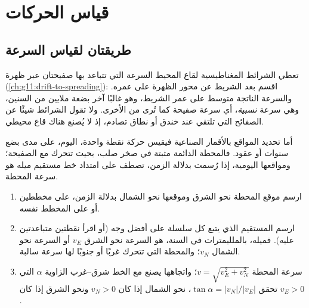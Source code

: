 \section{قياس الحركات}

\subsection{طريقتان لقياس السرعة}

تعطي الشرائط المغناطيسية لقاع المحيط السرعة التي تتباعد بها صفيحتان
عبر ظهرة (\cref{ch:g11:drift-to-spreading}): اقسم
بعد الشريط عن محور الظهرة على عمره. والسرعة الناتجة
متوسط على عمر الشريط، وهو غالبًا آخر بضعة ملايين من السنين، وهي
سرعة \emph{نسبية}، أي سرعة صفيحة كما تُرى من الأخرى. ولا تقول الشرائط
شيئًا عن الصفائح التي تلتقي عند خندق أو نطاق تصادم، إذ لا يُصنع
هناك قاع محيطي.

أما تحديد المواقع بالأقمار الصناعية فيقيس حركة نقطة واحدة، اليوم، على مدى
بضع سنوات أو عقود. فالمحطة الدائمة مثبتة في صخر صلب، بحيث
تتحرك مع الصفيحة؛ ومواقعها اليومية، إذا رُسمت بدلالة الزمن، تصطف
على امتداد خط مستقيم ميله هو سرعة المحطة.

\begin{method}\label{met:g11:plate-motions:rate}
\begin{enumerate}
  \item ارسم موقع المحطة نحو الشرق وموقعها نحو الشمال بدلالة
        الزمن، على مخططين أو على المخطط نفسه.
  \item ارسم المستقيم الذي يتبع كل سلسلة على أفضل وجه (أو اقرأ نقطتين
        متباعدتين عليه). فميله، بالملليمترات في السنة، هو
        السرعة نحو الشرق $v_E$ أو السرعة نحو الشمال $v_N$؛ والمحطة التي تتحرك غربًا أو
        جنوبًا لها سرعة سالبة.
  \item سرعة المحطة $v = \sqrt{v_E^2 + v_N^2}$؛ واتجاهها
        يصنع مع الخط شرق--غرب الزاوية $\alpha$ التي تحقق
        $\tan\alpha = |v_N|/|v_E|$، نحو الشمال إذا كان $v_N > 0$ ونحو
        الشرق إذا كان $v_E > 0$.
\end{enumerate}
\end{method}

